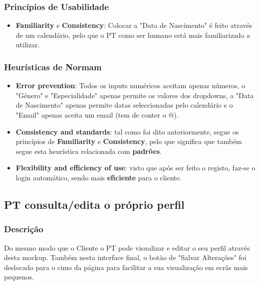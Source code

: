 \subsubsection{Princípios de Usabilidade}
\begin{itemize}
    \item \textbf{Familiarity} e \textbf{Consistency}: Colocar a "Data de Nascimento" é feito através de um calendário, pelo que o PT como ser humano está mais familiarizado a utilizar.
\end{itemize}

\subsubsection{Heurísticas de Normam}
\begin{itemize}
    \item \textbf{Error prevention}: Todos os inputs numéricos aceitam apenas números, o "Género" e "Especialidade" apenas permite os valores dos dropdowns, a "Data de Nascimento" apenas permite datas seleccionadas pelo calendário e o "Email" apenas aceita um email (tem de conter o @).
    \item \textbf{Consistency and standards}: tal como foi dito anteriormente, segue os princípios de \textbf{Familiarity} e \textbf{Consistency}, pelo que significa que também segue esta heurística relacionada com \textbf{padrões}.
    \item \textbf{Flexibility and efficiency of use}: visto que após ser feito o registo, faz-se o login automático, sendo mais \textbf{eficiente} para o cliente.
\end{itemize}

\subsection{PT consulta/edita o próprio perfil}
\label{subsec:perfilptbypt}

\subsubsection{Descrição}
\hspace{5mm} Do mesmo modo que o Cliente o PT pode visualizar e editar o seu perfil através desta mockup. Também nesta interface final, o botão de "Salvar Alterações" foi deslocado para o cimo da página para facilitar a sua visualização em ecrãs mais pequenos.

